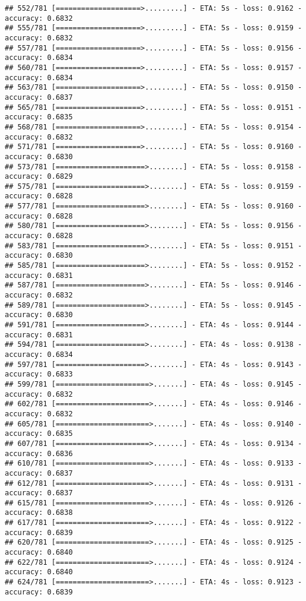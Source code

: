 \documentclass[
]{article}
\begin{document}
\begin{verbatim}
## 552/781 [====================>.........] - ETA: 5s - loss: 0.9162 - accuracy: 0.6832
## 555/781 [====================>.........] - ETA: 5s - loss: 0.9159 - accuracy: 0.6832
## 557/781 [====================>.........] - ETA: 5s - loss: 0.9156 - accuracy: 0.6834
## 560/781 [====================>.........] - ETA: 5s - loss: 0.9157 - accuracy: 0.6834
## 563/781 [====================>.........] - ETA: 5s - loss: 0.9150 - accuracy: 0.6837
## 565/781 [====================>.........] - ETA: 5s - loss: 0.9151 - accuracy: 0.6835
## 568/781 [====================>.........] - ETA: 5s - loss: 0.9154 - accuracy: 0.6832
## 571/781 [====================>.........] - ETA: 5s - loss: 0.9160 - accuracy: 0.6830
## 573/781 [=====================>........] - ETA: 5s - loss: 0.9158 - accuracy: 0.6829
## 575/781 [=====================>........] - ETA: 5s - loss: 0.9159 - accuracy: 0.6828
## 577/781 [=====================>........] - ETA: 5s - loss: 0.9160 - accuracy: 0.6828
## 580/781 [=====================>........] - ETA: 5s - loss: 0.9156 - accuracy: 0.6828
## 583/781 [=====================>........] - ETA: 5s - loss: 0.9151 - accuracy: 0.6830
## 585/781 [=====================>........] - ETA: 5s - loss: 0.9152 - accuracy: 0.6831
## 587/781 [=====================>........] - ETA: 5s - loss: 0.9146 - accuracy: 0.6832
## 589/781 [=====================>........] - ETA: 5s - loss: 0.9145 - accuracy: 0.6830
## 591/781 [=====================>........] - ETA: 4s - loss: 0.9144 - accuracy: 0.6831
## 594/781 [=====================>........] - ETA: 4s - loss: 0.9138 - accuracy: 0.6834
## 597/781 [=====================>........] - ETA: 4s - loss: 0.9143 - accuracy: 0.6833
## 599/781 [======================>.......] - ETA: 4s - loss: 0.9145 - accuracy: 0.6832
## 602/781 [======================>.......] - ETA: 4s - loss: 0.9146 - accuracy: 0.6832
## 605/781 [======================>.......] - ETA: 4s - loss: 0.9140 - accuracy: 0.6835
## 607/781 [======================>.......] - ETA: 4s - loss: 0.9134 - accuracy: 0.6836
## 610/781 [======================>.......] - ETA: 4s - loss: 0.9133 - accuracy: 0.6837
## 612/781 [======================>.......] - ETA: 4s - loss: 0.9131 - accuracy: 0.6837
## 615/781 [======================>.......] - ETA: 4s - loss: 0.9126 - accuracy: 0.6838
## 617/781 [======================>.......] - ETA: 4s - loss: 0.9122 - accuracy: 0.6839
## 620/781 [======================>.......] - ETA: 4s - loss: 0.9125 - accuracy: 0.6840
## 622/781 [======================>.......] - ETA: 4s - loss: 0.9124 - accuracy: 0.6840
## 624/781 [======================>.......] - ETA: 4s - loss: 0.9123 - accuracy: 0.6839

\end{verbatim}
\end{document}
